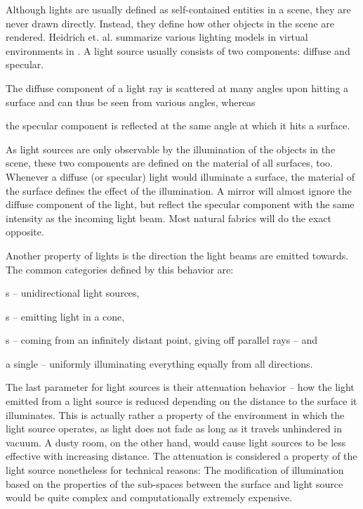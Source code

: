 	Although lights are usually defined as self-contained entities in a scene, they are never drawn directly. Instead, they define how other objects in the scene are rendered. Heidrich et. al. summarize various lighting models in virtual environments in \cite{Heidrich:1999:RHS:311535.311554}. A light source usually consists of two components: diffuse and specular.

	\begin{smalllist}
		\item The diffuse component of a light ray is scattered at many angles upon hitting a surface and can thus be seen from various angles, whereas
		\item the specular component is reflected at the same angle at which it hits a surface.
	\end{smalllist}

	As light sources are only observable by the illumination of the objects in the scene, these two components are defined on the material of all surfaces, too. Whenever a diffuse (or specular) light would illuminate a surface, the material of the surface defines the effect of the illumination. A mirror will almost ignore the diffuse component of the light, but reflect the specular component with the same intensity as the incoming light beam. Most natural fabrics will do the exact opposite.

	Another property of lights is the direction the light beams are emitted towards. The common categories defined by this behavior are:

	\begin{smalllist}
		\item {}s -- unidirectional light sources,
		\item {}s -- emitting light in a cone,
		\item {}s -- coming from an infinitely distant point, giving off parallel rays -- and
		\item a single  -- uniformly illuminating everything equally from all directions.
	\end{smalllist}

	The last parameter for light sources is their attenuation behavior -- how the light emitted from a light source is reduced depending on the distance to the surface it illuminates. This is actually rather a property of the environment in which the light source operates, as light does not fade as long as it travels unhindered in vacuum. A dusty room, on the other hand, would cause light sources to be less effective with increasing distance. The attenuation is considered a property of the light source nonetheless for technical reasons: The modification of illumination based on the properties of the sub-spaces between the surface and light source would be quite complex and computationally extremely expensive.

